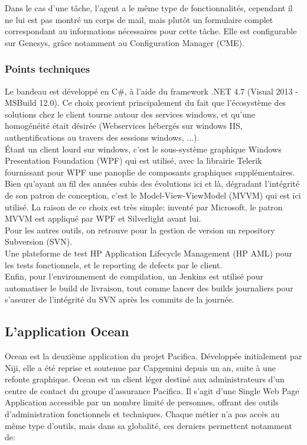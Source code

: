 \documentclass{rapport}
\begin{document}
Dans le cas d'une tâche, l'agent a le même type de fonctionnalités, cependant il ne lui est pas montré un corps de mail, mais plutôt un formulaire complet correspondant au informations nécessaires pour cette tâche. Elle est configurable sur Genesys, grâce notamment au Configuration Manager (CME).

\subsubsection{Points techniques}

Le bandeau est développé en C\#, à l'aide du framework .NET 4.7 (Visual 2013 - MSBuild 12.0). Ce choix provient principalement du fait que l'écosystème des solutions chez le client tourne autour des services windows, et qu'une homogénéité était désirée (Webservices hébergés sur windows IIS, authentifications au travers des sessions windows, ...).\\
Étant un client lourd sur windows, c'est le sous-système graphique Windows Presentation Foundation (WPF) qui est utilisé, avec la librairie Telerik fournissant pour WPF une panoplie de composants graphiques supplémentaires.\\

Bien qu'ayant au fil des années subis des évolutions ici et là, dégradant l'intégrité de son patron de conception, c'est le Model-View-ViewModel (MVVM) qui est ici utilisé. La raison de ce choix est très simple: inventé par Microsoft, le patron MVVM est appliqué par WPF et Silverlight avant lui.\\

Pour les autres outils, on retrouve pour la gestion de version un repository Subversion (SVN).\\
Une plateforme de test HP Application Lifecycle Management (HP AML) pour les tests fonctionnels, et le reporting de defects par le client.\\
Enfin, pour l'environnement de compilation, un Jenkins est utilisé pour automatiser le build de livraison, tout comme lancer des builds journaliers pour s'assurer de l'intégrité du SVN après les commits de la journée.

\subsection{L'application Ocean}

Ocean est la deuxième application du projet Pacifica. Développée initialement par Niji, elle a été reprise et soutenue par Capgemini depuis un an, suite à une refonte graphique. Ocean est un client léger destiné aux administrateurs d'un centre de contact du groupe d'assurance Pacifica. Il s'agit d'une Single Web Page Application accessible par un nombre limité de personnes, offrant des outils d'administration fonctionnels et techniques. Chaque métier n'a pas accès au même type d'outils, mais dans sa globalité, ces derniers permettent notamment de:\\
\end{document}
